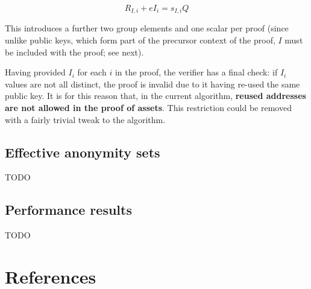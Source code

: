 \documentclass[10pt,a4paper]{article}
\begin{document}
$$ R_{I, i} + eI_i = s_{I, i} Q $$

This introduces a further two group elements and one scalar per proof (since unlike public keys, which form part of the precursor context of the proof, $I$ must be included with the proof; see next).

\vspace{5 pt}

Having provided $I_i$ for each $i$ in the proof, the verifier has a final check: if $I_i$ values are not all distinct, the proof is invalid due to it having re-used the same public key. It is for this reason that, in the current algorithm, \textbf{reused addresses are not allowed in the proof of assets}. This restriction could be removed with a fairly trivial tweak to the algorithm.

\subsection{Effective anonymity sets}

TODO

\subsection{Performance results}

TODO



\hypertarget{references}{%
\section[References]{\texorpdfstring{\protect\hypertarget{anchor-77}{}{}References}{References}}\label{references}}
\end{document}
